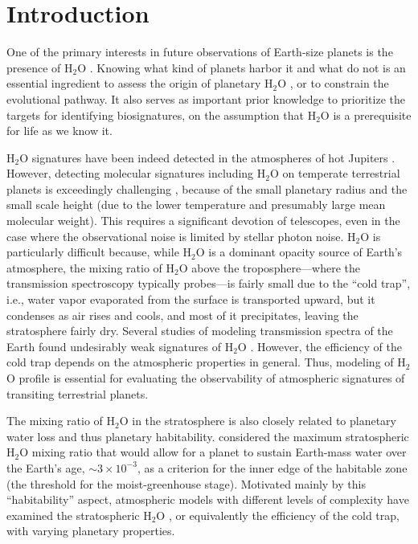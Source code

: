 \documentclass[11pt,numberedappendix,twocolappendix,]{emulateapj}
\def\water{H$_2$O }
\begin{document}

\section{Introduction}
\label{s:intro}

One of the primary interests in future observations of Earth-size planets is the presence of \water. 
Knowing what kind of planets harbor it and what do not is an essential ingredient to assess the origin of planetary \water, or to constrain the evolutional pathway. 
It also serves as important prior knowledge to prioritize the targets for identifying biosignatures, on the assumption that \water is a prerequisite for life as we know it. 

\water signatures have been indeed detected in the atmospheres of hot Jupiters \citep[e.g.,][]{Sing2016}. 
However, detecting molecular signatures including \water on temperate terrestrial planets is exceedingly challenging \citep{Cowan2015}, 
because of the small planetary radius and the small scale height (due to the lower temperature and presumably large mean molecular weight). 
This requires a significant devotion of telescopes, even in the case where the observational noise is limited by stellar photon noise. 
\water is particularly difficult because, while \water is a dominant opacity source of Earth's atmosphere, the mixing ratio of \water above the troposphere---where the transmission spectroscopy typically probes---is fairly small due to the ``cold trap'', i.e., water vapor evaporated from the surface is transported upward, but it condenses as air rises and cools, and most of it precipitates, leaving the stratosphere fairly dry. 
Several studies of modeling transmission spectra of the Earth found  undesirably weak signatures of \water \citep[e.g.,][]{Ehrenreich2006, Kaltenegger2009, Betremieux2013, Misra2014}. 
However, the efficiency of the cold trap depends on the atmospheric properties in general. 
Thus, modeling of \water profile is essential for evaluating the observability of atmospheric signatures of transiting terrestrial planets. 

The mixing ratio of \water in the stratosphere is also closely related to planetary water loss and thus planetary habitability. 
\citet{Kasting1993} considered the maximum stratospheric \water mixing ratio that would allow for a planet to sustain Earth-mass water over the Earth's age, $\sim 3 \times 10^{-3}$, as a criterion for the inner edge of the habitable zone (the threshold for the moist-greenhouse stage). 
Motivated mainly by this ``habitability'' aspect, atmospheric models with different levels of complexity have examined the stratospheric \water, or equivalently the efficiency of the cold trap, with varying planetary properties. 
\end{document}
